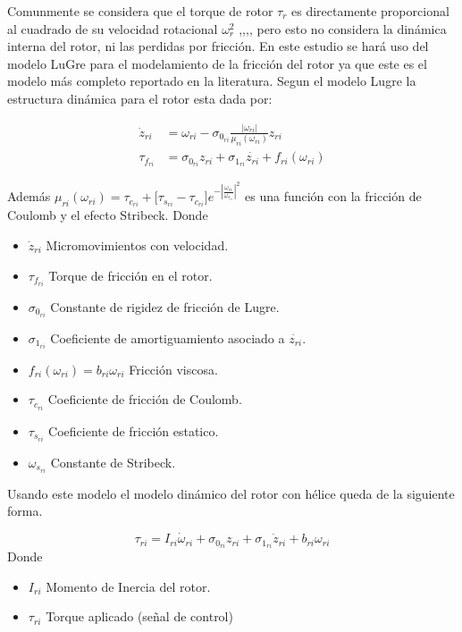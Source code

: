 \documentclass[a4paper]{IEEEtran} %
\begin{document}
Comunmente se considera que el torque de rotor $\tau_r$ es directamente proporcional al cuadrado de su velocidad rotacional $\omega^2_r$ \cite{nemati2014modeling},\cite{schulz2015high},\cite{koehl2012aerodynamic},\cite{mellinger2012trajectory}, pero esto no considera la dinámica interna del rotor, ni las perdidas por fricción. En este estudio se hará uso del modelo LuGre para el modelamiento de la fricción del rotor ya que este es el modelo más completo reportado en la literatura\cite{reyes2019drones}.
Segun el modelo Lugre la estructura dinámica para el rotor esta dada por:

\begin{equation}
    \begin{split}
        \dot{z}_{ri}&=\omega_{ri}-\sigma_{0_{ri}}\frac{|\omega_{ri}|}{\mu_{ri}(\omega_{ri})}z_{ri}\\
        \tau_{f_{ri}}&=\sigma_{0_{ri}}z_{ri}+\sigma_{1_{ri}}\dot{z_{ri}}+f_{ri}(\omega_{ri})
    \end{split}
    \label{eq:lugre}
\end{equation}

Además
    $\mu_{ri}(\omega_{ri})=\tau_{c_{ri}}+\lbrack\tau_{s_{ri}}-\tau_{c_{ri}}\rbrack e^{-|\frac{\omega_{ri}}{\omega_{s_{ri}}}|^2}$ es una función con la fricción de Coulomb y el efecto Stribeck. 
Donde
    \begin{itemize}
        \item $\dot{z}_{ri}$ Micromovimientos con velocidad.
        \item $\tau_{f_{ri}}$ Torque de fricción en el rotor.
        \item $\sigma_{0_{ri}}$ Constante de rigidez de fricción de Lugre.
        \item $\sigma_{1_{ri}}$ Coeficiente de amortiguamiento asociado a $\dot{z_{ri}}$.
        \item $f_{ri}(\omega_{ri})=b_{ri}\omega_{ri}$ Fricción viscosa.
        \item $\tau_{c_{ri}}$ Coeficiente de fricción de Coulomb.
        \item $\tau_{s_{ri}}$ Coeficiente de fricción estatico.
        \item $\omega_{s_{ri}}$ Constante de Stribeck. 
    \end{itemize}

Usando este modelo el modelo dinámico del rotor con hélice queda de la siguiente forma.

\begin{equation}
    \tau_{ri}=I_{ri}\dot{\omega}_{ri}+\sigma_{0_{ri}}z_{ri}+\sigma_{1_{ri}}\dot{z}_{ri}+b_{ri}\omega_{ri}
    \label{eq:fric_rotor}
\end{equation}
Donde 
\begin{itemize}
    \item $I_{ri}$ Momento de Inercia del rotor.
    \item $\tau_{ri}$ Torque aplicado (señal de control) 
\end{itemize} 
\end{document}
